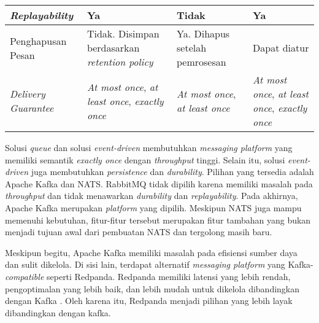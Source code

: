 \begin{longtable}{|p{}|p{}|p{}|p{}|}
    \hline
    \textit{Replayability}       & Ya                                                                   & Tidak                                         & Ya                                                                   \\
    \hline
    Penghapusan Pesan            & Tidak. Disimpan berdasarkan \textit{retention policy}                & Ya. Dihapus setelah pemrosesan                & Dapat diatur                                                         \\
    \hline
    \textit{Delivery Guarantee}  & \textit{At most once}, \textit{at least once}, \textit{exactly once} & \textit{At most once}, \textit{at least once} & \textit{At most once}, \textit{at least once}, \textit{exactly once} \\
    \hline
\end{longtable}
\endgroup

Solusi \textit{queue} dan solusi \textit{event-driven} membutuhkan \textit{messaging platform} yang memiliki semantik \textit{exactly once} dengan \textit{throughput} tinggi. Selain itu, solusi \textit{event-driven} juga membutuhkan \textit{persistence} dan \textit{durability}. Pilihan yang tersedia adalah Apache Kafka dan NATS. RabbitMQ tidak dipilih karena memiliki masalah pada \textit{throughput} dan tidak menawarkan \textit{durability} dan \textit{replayability}. Pada akhirnya, Apache Kafka merupakan \textit{platform} yang dipilih. Meskipun NATS juga mampu memenuhi kebutuhan, fitur-fitur tersebut merupakan fitur tambahan yang bukan menjadi tujuan awal dari pembuatan NATS dan tergolong masih baru.

Meskipun begitu, Apache Kafka memiliki masalah pada efisiensi sumber daya dan sulit dikelola. Di sisi lain, terdapat alternatif \textit{messaging platform} yang Kafka-\textit{compatible} seperti Redpanda. Redpanda memiliki latensi yang lebih rendah, pengoptimalan yang lebih baik, dan lebih mudah untuk dikelola dibandingkan dengan Kafka \parencite{comparingKafkaAlternatives}. Oleh karena itu, Redpanda menjadi pilihan yang lebih layak dibandingkan dengan kafka.